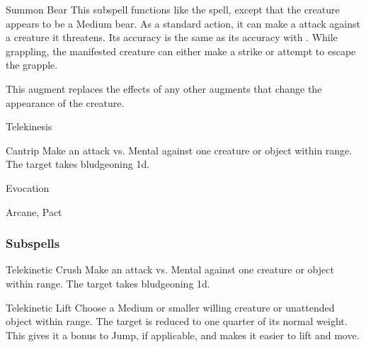 \begin{ability}[\nth{2}]{Summon Bear}
This subspell functions like the  spell, except that the creature appears to be a Medium bear.
As a standard action, it can make a  attack against a creature it threatens.
Its accuracy is the same as its accuracy with .
While grappling, the manifested creature can either make a strike or attempt to escape the grapple.

This augment replaces the effects of any other augments that change the appearance of the creature.
\end{ability}
\vspace{0.25em}

\newpage
\begin{spellsection}{Telekinesis}

\begin{spellheader}
\end{spellheader}


\begin{ability}{Cantrip}
Make an attack vs. Mental against one creature or object within \rngmed range.
\hit The target takes bludgeoning  \minus1d.
\end{ability}




 Evocation

 Arcane, Pact
\end{spellsection}


\subsubsection{Subspells}


\begin{ability}[\nth{1}]{Telekinetic Crush}
Make an attack vs. Mental against one creature or object within \rngmed range.
\hit The target takes bludgeoning  \plus1d.
\end{ability}
\vspace{0.25em}


\begin{ability}[\nth{1}]{Telekinetic Lift}
Choose a Medium or smaller willing creature or unattended object within \rngclose range.
The target is reduced to one quarter of its normal weight.
This gives it a  bonus to Jump, if applicable, and makes it easier to lift and move.
\end{ability}
\vspace{0.25em}


